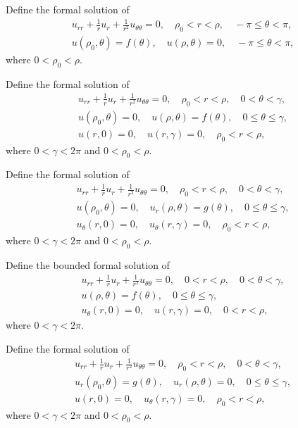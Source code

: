 \exercises
\begin{exerciselist}

\item\label{exer:12.4.1}Define the formal solution of
\begin{gather*}
u_{rr}+\frac{1}{r}u_r+\frac{1}{r^2}u_{\theta\theta}=0,\quad
\rho_0<r<\rho,\quad -\pi\le\theta<\pi,\\
u(\rho_0,\theta)=f(\theta),\quad  u(\rho,\theta)=0,\quad
-\pi\le\theta<\pi,
\end{gather*}
where $0<\rho_0<\rho$.

\item\label{exer:12.4.2}Define the  formal solution of
\begin{gather*}
u_{rr}+\frac{1}{r}u_r+\frac{1}{r^2}u_{\theta\theta}=0,\quad
\rho_0<r<\rho,\quad 0<\theta<\gamma,\\
u(\rho_0,\theta)=0,\quad  u(\rho,\theta)=f(\theta),\quad
0\le\theta\le\gamma,\\
u(r,0)=0,\quad u(r,\gamma)=0,\quad \rho_0<r<\rho,
\end{gather*}
where $0<\gamma<2\pi$ and $0<\rho_0<\rho$.


\item\label{exer:12.4.3}Define the  formal solution of
\begin{gather*}
u_{rr}+\frac{1}{r}u_r+\frac{1}{r^2}u_{\theta\theta}=0,\quad
\rho_0<r<\rho,\quad 0<\theta<\gamma,\\
u(\rho_0,\theta)=0,\quad  u_r(\rho,\theta)=g(\theta),\quad
0\le\theta\le\gamma,\\
u_\theta(r,0)=0,\quad u_\theta(r,\gamma)=0,\quad \rho_0<r<\rho,
\end{gather*}
where $0<\gamma<2\pi$ and $0<\rho_0<\rho$.


\item\label{exer:12.4.4}Define the bounded formal solution of
\begin{gather*}
u_{rr}+\frac{1}{r}u_r+\frac{1}{r^2}u_{\theta\theta}=0,\quad
0<r<\rho,\quad 0<\theta<\gamma,\\
  u(\rho,\theta)=f(\theta),\quad
0\le\theta\le\gamma,\\
u_\theta(r,0)=0,\quad u(r,\gamma)=0,\quad 0<r<\rho,
\end{gather*}
where $0<\gamma<2\pi$.


\item\label{exer:12.4.5}Define the  formal solution of
\begin{gather*}
u_{rr}+\frac{1}{r}u_r+\frac{1}{r^2}u_{\theta\theta}=0,\quad
\rho_0<r<\rho,\quad 0<\theta<\gamma,\\
u_r(\rho_0,\theta)=g(\theta),\quad
u_r(\rho,\theta)=0,\quad
0\le\theta\le\gamma,\\
u(r,0)=0,\quad u_\theta(r,\gamma)=0,\quad \rho_0<r<\rho,
\end{gather*}
where $0<\gamma<2\pi$ and $0<\rho_0<\rho$.



\end{exerciselist}
